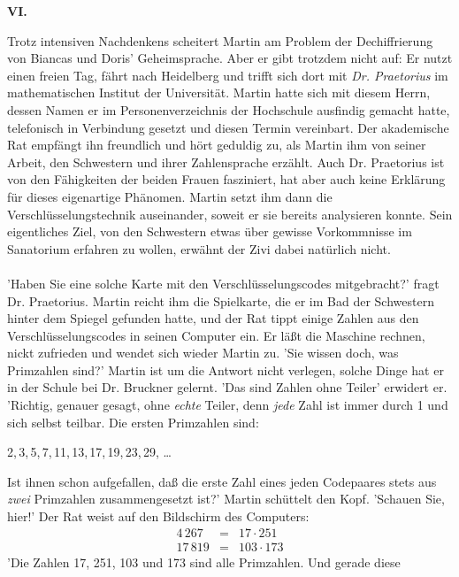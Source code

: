 \begin{center}
{\bf VI.}
\end{center}
Trotz intensiven Nachdenkens scheitert Martin am Problem der Dechiffrierung
von Biancas und Doris' Geheimsprache. Aber er gibt trotzdem nicht auf: Er
nutzt einen freien Tag, f\"ahrt nach Heidelberg und trifft sich dort mit
{\em Dr. Praetorius\/} im mathematischen Institut der Universit\"at. Martin
hatte sich mit diesem Herrn, dessen Namen er im Personenverzeichnis
der Hochschule ausfindig gemacht hatte, telefonisch in Verbindung gesetzt
und diesen Termin vereinbart. Der akademische Rat empf\"angt ihn freundlich
und h\"ort geduldig zu, als Martin ihm von seiner Arbeit, den Schwestern
und ihrer Zahlensprache erz\"ahlt. Auch Dr. Praetorius ist von den
F\"ahigkeiten der beiden Frauen fasziniert, hat aber auch keine Erkl\"arung
f\"ur dieses eigenartige Ph\"anomen. Martin setzt ihm dann die
Verschl\"usselungstechnik auseinander, soweit er sie bereits analysieren
konnte. Sein eigentliches Ziel, von den Schwestern etwas \"uber gewisse
Vorkommnisse im Sanatorium erfahren zu wollen, erw\"ahnt der Zivi dabei
nat\"urlich nicht. \\ \\
'Haben Sie eine solche Karte mit den Verschl\"usselungscodes mitgebracht?'
fragt Dr. Praetorius. Martin reicht ihm die Spielkarte, die er im Bad der
Schwestern hinter dem Spiegel gefunden hatte, und der Rat tippt einige Zahlen
aus den Verschl\"usselungscodes in seinen Computer ein. Er l\"a{\ss}t die
Maschine rechnen, nickt zufrieden und wendet sich wieder Martin zu. 'Sie
wissen doch, was Primzahlen sind?' Martin ist um die Antwort nicht verlegen,
solche Dinge hat er in der Schule bei Dr. Bruckner gelernt. 'Das sind Zahlen
ohne Teiler' erwidert er. 'Richtig, genauer gesagt, ohne {\em echte\/} Teiler,
denn {\em jede\/} Zahl ist immer durch 1 und sich selbst teilbar. Die ersten
Primzahlen sind:
\begin{center}
2,\,3,\,5,\,7,\,11,\,13,\,17,\,19,\,23,\,29, \quad \dots
\end{center}
Ist ihnen schon aufgefallen, da{\ss} die erste Zahl eines jeden Codepaares
stets aus {\em zwei\/} Primzahlen zusammengesetzt ist?' Martin sch\"uttelt
den Kopf. 'Schauen Sie, hier!' Der Rat weist auf den Bildschirm des Computers:
\[\begin{array}{rcc}
4\,267 & = & 17\cdot 251 \\
17\,819 & = & 103\cdot 173
\end{array} \]
'Die Zahlen 17, 251, 103 und 173 sind alle Primzahlen. Und gerade diese

